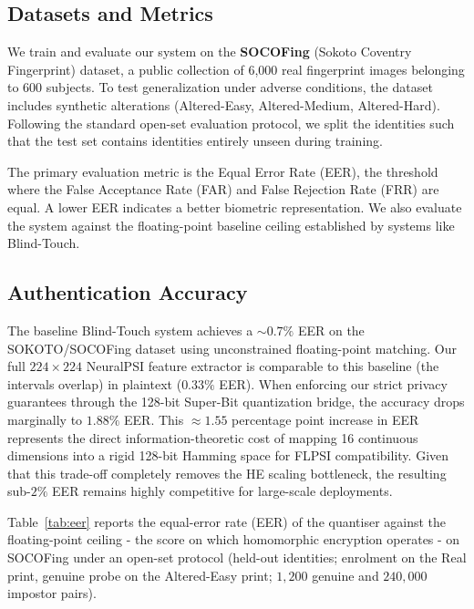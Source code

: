 \documentclass[11pt,a4paper]{article}
\begin{document}
\subsection{Datasets and Metrics}


We train and evaluate our system on the \textbf{SOCOFing} (Sokoto Coventry Fingerprint) dataset, a public collection of 6,000 real fingerprint images belonging to 600 subjects. To test generalization under adverse conditions, the dataset includes synthetic alterations (Altered-Easy, Altered-Medium, Altered-Hard). Following the standard open-set evaluation protocol, we split the identities such that the test set contains identities entirely unseen during training.

The primary evaluation metric is the Equal Error Rate (EER), the threshold where the False Acceptance Rate (FAR) and False Rejection Rate (FRR) are equal. A lower EER indicates a better biometric representation. We also evaluate the system against the floating-point baseline ceiling established by systems like Blind-Touch.

\subsection{Authentication Accuracy}


The baseline Blind-Touch system achieves a $\sim 0.7\%$ EER on the SOKOTO/SOCOFing dataset using unconstrained floating-point matching. Our full $224\times224$ NeuralPSI feature extractor is comparable to this baseline (the intervals overlap) in plaintext ($0.33\%$ EER). When enforcing our strict privacy guarantees through the 128-bit Super-Bit quantization bridge, the accuracy drops marginally to $1.88\%$ EER. This $\approx 1.55$ percentage point increase in EER represents the direct information-theoretic cost of mapping 16 continuous dimensions into a rigid 128-bit Hamming space for FLPSI compatibility. Given that this trade-off completely removes the HE scaling bottleneck, the resulting sub-$2\%$ EER remains highly competitive for large-scale deployments.

Table~\ref{tab:eer} reports the equal-error rate (EER) of the quantiser against the
floating-point ceiling - the score on which homomorphic encryption operates - on
SOCOFing under an open-set protocol (held-out identities; enrolment on the Real print,
genuine probe on the Altered-Easy print; $1{,}200$ genuine and $240{,}000$ impostor
pairs).
\end{document}
